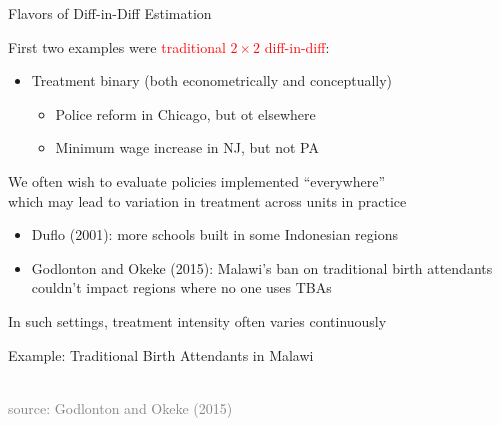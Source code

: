 \documentclass[10pt,xcolor=table,ignorenonframetext,aspectratio=169]{beamer}
\newlength{\wideitemsep}
\let\olditem\item
\renewcommand{\item}{\setlength{\itemsep}{\wideitemsep}\olditem}
\begin{document}
\begin{frame}{Flavors of Diff-in-Diff Estimation}


\medskip
First two examples were \textcolor{red}{traditional $2\times2$ diff-in-diff}:

\medskip
\begin{itemize}
	
	\item Treatment binary (both econometrically and conceptually)
	
	\medskip
	\begin{itemize}
		
		\item Police reform in Chicago, but ot elsewhere
		
		\item Minimum wage increase in NJ, but not PA
		
	\end{itemize}
	
\end{itemize}

\pause
\medskip
We often wish to evaluate policies implemented ``everywhere'' \\
which may lead to variation in treatment across units in practice

\medskip
\begin{itemize}
	
	\item Duflo (2001):  more schools built in some Indonesian regions
	
	\item Godlonton and Okeke (2015):  Malawi's ban on traditional birth attendants couldn't impact regions where no one uses TBAs
	
\end{itemize}

\pause
\medskip
In such settings, treatment intensity often varies continuously

\end{frame}



\begin{frame}{Example:  Traditional Birth Attendants in Malawi}

\medskip
\begin{center}
	 \\
	\textcolor{gray}{\tiny{source:  Godlonton and Okeke (2015)}}
\end{center}


\end{frame}
\end{document}
